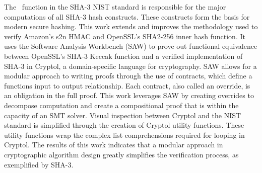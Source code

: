The \keccak\ function in the SHA-3 NIST standard is responsible for the major computations of all SHA-3 hash constructs.
These constructs form the basis for modern secure hashing.
This work extends and improves the methodology used to verify Amazon's s2n HMAC and OpenSSL's SHA2-256 inner hash function. 
It uses the Software Analysis Workbench (SAW) to prove out functional equivalence between OpenSSL's SHA-3 Keccak function and a verified implementation of SHA-3 in Cryptol, a domain-specific language for cryptography. 
SAW allows for a modular approach to writing proofs through the use of contracts, which define a functions input to output relationship.
Each contract, also called an override, is an obligation in the full proof.
This work leverages SAW by creating overrides to decompose computation and create a compositional proof that is within the capacity of an SMT solver. 
Visual inspection between Cryptol and the NIST standard is simplified through the creation of Cryptol utility functions.
These utility functions wrap the complex list comprehensions required for looping in Cryptol.
The results of this work indicates that a modular approach in cryptographic algorithm design greatly simplifies the verification process, as exemplified by SHA-3.
